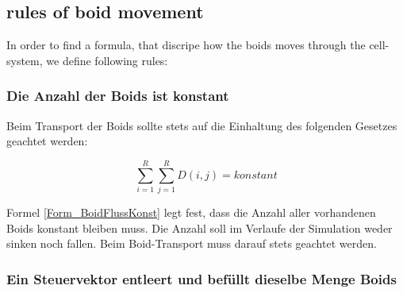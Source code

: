 \documentclass[a4paper, 10pt, journal]{wissarbIEEE}      %
\begin{document}

\subsection{rules of boid movement}



In order to find a formula, that discripe how the boids moves through the cell-system, we define following rules:

\subsubsection{Die Anzahl der Boids ist konstant}

Beim Transport der Boids sollte stets auf die Einhaltung des folgenden Gesetzes geachtet werden:

\begin{equation}
\sum_{i=1}^R \sum_{j=1}^R D(i,j)  = konstant
\label{Form_BoidFlussKonst}
\end{equation}

Formel \ref{Form_BoidFlussKonst} legt fest, dass die Anzahl aller vorhandenen Boids konstant bleiben muss. Die Anzahl soll im Verlaufe der Simulation weder sinken noch fallen. Beim Boid-Transport muss darauf stets geachtet werden.


\subsubsection{Ein Steuervektor entleert und befüllt dieselbe Menge Boids}
\label{subsubsec_D_V}
\end{document}
